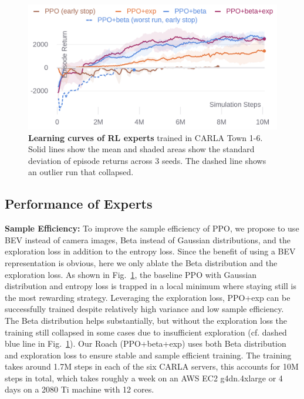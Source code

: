 \begin{figure}[t]
	\begin{center}
		\includegraphics[width=\linewidth]{img/rl.png}
	\end{center}
	\vspace{-4ex}
	\caption{\textbf{Learning curves of RL experts }
		trained in CARLA Town 1-6.
		Solid lines show the mean and shaded areas show the standard deviation of episode returns across 3 seeds.
		The dashed line shows an outlier run that collapsed.}
	\vspace{-2ex}
	\label{fig:rl}
\end{figure}


\subsection{Performance of Experts}

\textbf{\textsf{Sample Efficiency:}}
To improve the sample efficiency of PPO, we propose to use BEV instead of camera images, Beta instead of Gaussian distributions, and the exploration loss in addition to the entropy loss.
Since the benefit of using a BEV representation is obvious, here we only ablate the Beta distribution and the exploration loss.
As shown in Fig.~\ref{fig:rl}, the baseline PPO with Gaussian distribution and entropy loss is trapped in a local minimum where staying still is the most rewarding strategy.
Leveraging the exploration loss, PPO+exp can be successfully trained despite relatively high variance and low sample efficiency.
The Beta distribution helps substantially, but without the exploration loss the training still collapsed in some cases due to insufficient exploration (cf. dashed blue line in Fig.~\ref{fig:rl}).
Our Roach (PPO+beta+exp) uses both Beta distribution and exploration loss to ensure stable and sample efficient training.
The training takes around 1.7M steps in each of the six CARLA servers, this accounts for 10M steps in total, which takes roughly a week on an AWS EC2 g4dn.4xlarge or 4 days on a 2080 Ti machine with 12 cores.



